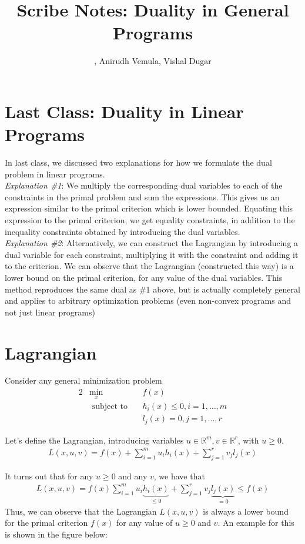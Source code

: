 \documentclass[11pt]{article}
\title{Scribe Notes: Duality in General Programs}
\author{\Name, Anirudh Vemula, Vishal Dugar}
\newcommand{\R}{\mathbb{R}}
\begin{document}
\maketitle

\section{Last Class: Duality in Linear Programs}

In last class, we discussed two explanations for how we formulate the dual problem in linear programs.\\
\textit{Explanation \#1}: We multiply the corresponding dual variables to each of the constraints in the primal problem and sum the expressions. This gives us an expression similar to the primal criterion which is lower bounded. Equating this expression to the primal criterion, we get equality constraints, in addition to the inequality constraints obtained by introducing the dual variables. \\
\textit{Explanation \#2}: Alternatively, we can construct the Lagrangian by introducing a dual variable for each constraint, multiplying it with the constraint and adding it to the criterion. We can observe that the Lagrangian (constructed this way) is a lower bound on the primal criterion, for any value of the dual variables. This method reproduces the same dual as \#1 above, but is actually completely general and applies to arbitrary optimization problems (even non-convex programs and not just linear programs)


\section{Lagrangian}

Consider any general minimization problem
\begin{alignat*}{2}
&\min_x &&f(x) \\
&\text{ subject to}&~&h_i(x) \leq 0, i = 1, \dots, m \\
&&&l_j(x) = 0, j = 1, \dots, r
\end{alignat*}

Let's define the Lagrangian, introducing variables $u \in \R^m, v \in \R^r$,
with $u \geq 0$.
\begin{align*}
L(x, u, v) = f(x) + \sum_{i=1}^m u_i h_i(x) + \sum_{j=1}^r v_j l_j(x)
\end{align*}

It turns out that for any $u \geq 0$ and any $v$, we have that
\begin{align*}
L(x, u, v) = f(x) \sum_{i=1}^m u_i \underbrace{h_i(x)}_{\leq 0} + \sum_{j=1}^r v_j \underbrace{l_j(x)}_{=0} \leq f(x)
\end{align*}
Thus, we can observe that the Lagrangian $L(x, u, v)$ is always a lower bound for the primal criterion $f(x)$ for any value of $u \geq 0$ and $v$. An example for this is shown in the figure below:
\end{document}

